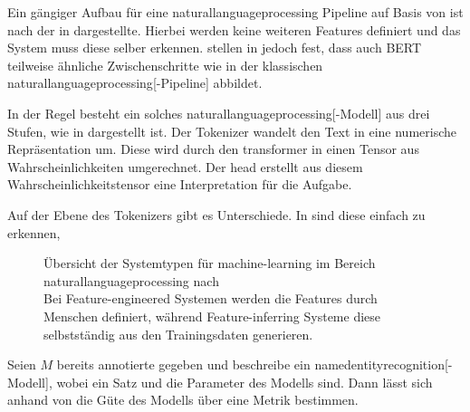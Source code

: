 Ein gängiger Aufbau für eine \gls{naturallanguageprocessing}
Pipeline
auf Basis von 
ist nach
\autocite{1910.03771}
der in  dargestellte.
Hierbei werden keine weiteren Features definiert
und das System muss diese selber erkennen.
\citeauthor{1905.05950} stellen in  jedoch fest,
dass auch \gls{BERT} teilweise ähnliche Zwischenschritte
wie in der klassischen \gls{naturallanguageprocessing}[-Pipeline]
abbildet.\autocite{1905.05950}

In der Regel besteht ein solches \gls{naturallanguageprocessing}[-Modell] aus drei Stufen,
wie in  dargestellt ist.
Der Tokenizer wandelt den Text in eine numerische Repräsentation um.
Diese wird durch den \gls{transformer} in einen Tensor aus Wahrscheinlichkeiten umgerechnet.
Der head erstellt aus diesem Wahrscheinlichkeitstensor eine Interpretation für die Aufgabe.


Auf der Ebene des Tokenizers gibt es Unterschiede.
In \autocite[Table 1]{1910.11470} sind diese einfach zu erkennen,


\begin{figure}[ht]
	\nocite{latexdraw:trees}
	\begin{tcolorbox}[tfigurestyle]
		\begin{center}
			
		\end{center}
	\end{tcolorbox}
	\caption[%
        Übersicht der Systemtypen für %
    ]{
		Übersicht der Systemtypen für \gls{machine-learning} im Bereich \gls{naturallanguageprocessing}
		nach \autocite[Table 1]{1910.11470}\\
        Bei Feature-engineered Systemen werden die Features durch Menschen definiert,
        während Feature-inferring Systeme diese selbstständig aus den Trainingsdaten generieren.
	}%
	\label{fig:model:types}
\end{figure}


\begin{defn}
	Seien \(M\) bereits annotierte 
	 gegeben
	und beschreibe  ein \gls{namedentityrecognition}[-Modell],
	wobei  ein Satz
	und  die Parameter des Modells sind.
	Dann lässt sich anhand von 
	die Güte des Modells über eine Metrik bestimmen.
\end{defn}

